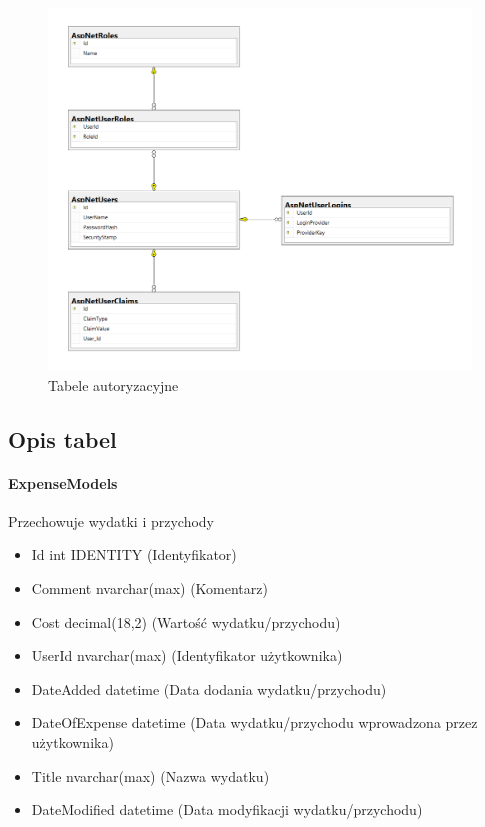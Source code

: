 \documentclass[10pt,titlepage]{article}
\begin{document}
\begin{figure}[H]
  \centering
  \includegraphics[scale=0.5]{images/db3.png}
  \caption{Tabele autoryzacyjne}
\end{figure}
\subsection{Opis tabel}
\paragraph[short]{ExpenseModels}
Przechowuje wydatki i przychody
\begin{itemize}
  \item Id int IDENTITY (Identyfikator)
  \item Comment nvarchar(max) (Komentarz)
  \item Cost decimal(18,2) (Wartość wydatku/przychodu)
  \item UserId nvarchar(max) (Identyfikator użytkownika)
  \item DateAdded datetime (Data dodania wydatku/przychodu)
  \item DateOfExpense datetime (Data wydatku/przychodu wprowadzona przez użytkownika)
  \item Title nvarchar(max) (Nazwa wydatku)
  \item DateModified datetime (Data modyfikacji wydatku/przychodu)
\end{itemize}
\end{document}
